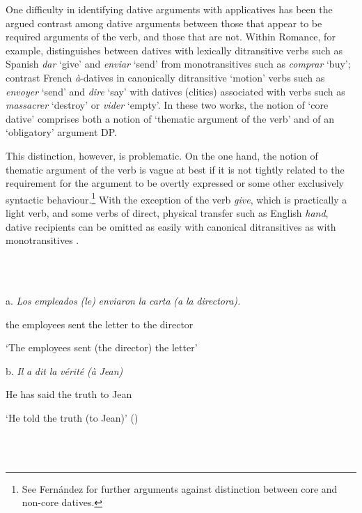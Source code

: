 \documentclass[output=paper,modfonts,nonflat]{langsci/langscibook}
\begin{document}
One difficulty in identifying dative arguments with applicatives has been the argued contrast among dative arguments between those that appear to be required arguments of the verb, and those that are not. Within Romance, for example, \citet{Pujalte2009} distinguishes between datives with lexically ditransitive verbs such as Spanish \textit{dar} ‘give’ and \textit{enviar} ‘send’ from monotransitives such as \textit{comprar} ‘buy’; \citet{BonehNash2012} contrast French \textit{à}{}-datives in canonically ditransitive ‘motion’ verbs such as \textit{envoyer} ‘send’ and \textit{dire} ‘say’ with datives (clitics) associated with verbs such as \textit{massacrer} ‘destroy’ or \textit{vider} ‘empty’. In these two works, the notion of ‘core dative’ comprises both a notion of ‘thematic argument of the verb’ and of an ‘obligatory’ argument DP.  

This distinction, however, is problematic. On the one hand, the notion of thematic argument of the verb is vague at best if it is not tightly related to the requirement for the argument to be overtly expressed or some other exclusively syntactic behaviour.\footnote{See Fernández \citet{Alcalde2014} for further arguments against  distinction between core and non-core datives.}  With the exception of the verb \textit{give}, which is practically a light verb, and some verbs of direct, physical transfer such as English \textit{hand}, dative recipients can be omitted as easily with canonical ditransitives  as with monotransitives .

\ea%
    \label{ex:key:1}
    \gll\\
        \\
    \glt
    \z

          a.  \textit{Los} \textit{empleados} \textit{(le)} \textit{enviaron}  \textit{la} \textit{carta} \textit{(a} \textit{la} \textit{directora).} 

       the employees sent the letter to the director

       ‘The employees sent (the director) the letter’

  b.  \textit{Il} \textit{a} \textit{dit} \textit{la} \textit{vérité} \textit{(à} \textit{Jean)} 

       He has said the truth to Jean

       ‘He told the truth (to Jean)’    (\citealt{BonehNash2012})

\ea%
    \label{ex:key:2}
    \gll\\
        \\
    \glt
    \z
\end{document}
